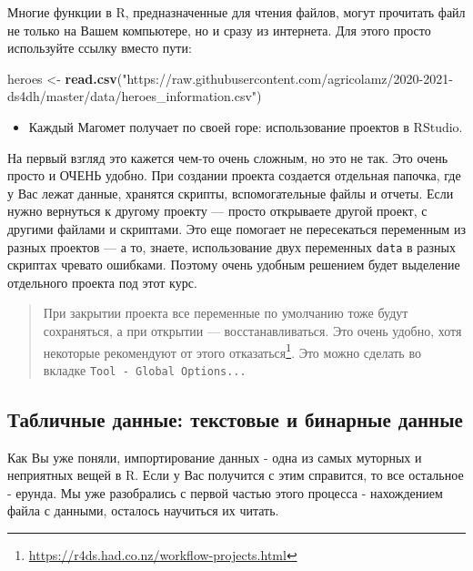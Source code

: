 \documentclass[
]{book}
\newenvironment{Shaded}{\begin{snugshade}}{\end{snugshade}}
\newcommand{\KeywordTok}[1]{\textcolor[rgb]{0.13,0.29,0.53}{\textbf{#1}}}
\newcommand{\NormalTok}[1]{#1}
\newcommand{\StringTok}[1]{\textcolor[rgb]{0.31,0.60,0.02}{#1}}
\providecommand{\tightlist}{%
  \setlength{\itemsep}{0pt}\setlength{\parskip}{0pt}}
\renewcommand{\href}[2]{#2\footnote{\url{#1}}}
\begin{document}
Многие функции в R, предназначенные для чтения файлов, могут прочитать файл не только на Вашем компьютере, но и сразу из интернета. Для этого просто используйте ссылку вместо пути:

\begin{Shaded}
\begin{Highlighting}[]
\NormalTok{heroes <-}\StringTok{ }\KeywordTok{read.csv}\NormalTok{(}\StringTok{"https://raw.githubusercontent.com/agricolamz/2020-2021-ds4dh/master/data/heroes_information.csv"}\NormalTok{)}
\end{Highlighting}
\end{Shaded}

\begin{itemize}
\tightlist
\item
  Каждый Магомет получает по своей горе: использование проектов в RStudio.
\end{itemize}

На первый взгляд это кажется чем-то очень сложным, но это не так. Это очень просто и ОЧЕНЬ удобно. При создании проекта создается отдельная папочка, где у Вас лежат данные, хранятся скрипты, вспомогательные файлы и отчеты. Если нужно вернуться к другому проекту --- просто открываете другой проект, с другими файлами и скриптами. Это еще помогает не пересекаться переменным из разных проектов --- а то, знаете, использование двух переменных \texttt{data} в разных скриптах чревато ошибками. Поэтому очень удобным решением будет выделение отдельного проекта под этот курс.

\begin{quote}
При закрытии проекта все переменные по умолчанию тоже будут сохраняться, а при открытии --- восстанавливаться. Это очень удобно, хотя некоторые \href{https://r4ds.had.co.nz/workflow-projects.html}{рекомендуют от этого отказаться}. Это можно сделать во вкладке \texttt{Tool\ -\ Global\ Options...}
\end{quote}

\hypertarget{text_binary}{%
\subsection{Табличные данные: текстовые и бинарные данные}\label{text_binary}}

Как Вы уже поняли, импортирование данных - одна из самых муторных и неприятных вещей в R. Если у Вас получится с этим справится, то все остальное - ерунда. Мы уже разобрались с первой частью этого процесса - нахождением файла с данными, осталось научиться их читать.
\end{document}

